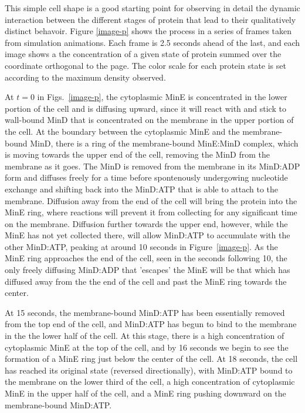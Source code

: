 \documentclass[letterpaper,twocolumn,amsmath,amssymb,pre]{revtex4-1}
\begin{document}
This simple cell shape is a good starting point for observing in
detail the dynamic interaction between the different stages of protein
that lead to their qualitatively distinct behavoir. Figure
\ref{image-p} shows the process in a series of frames taken from
simulation animations.  Each frame is 2.5 seconds ahead of the last,
and each image shows a the concentration of a given state of protein
summed over the coordinate orthogonal to the page.  The color scale
for each protein state is set according to the maximum density
observed.

At $t=0$ in Figs.~\ref{image-p}, the cytoplasmic MinE is concentrated
in the lower portion of the cell and is diffusing upward, since it
will react with and stick to wall-bound MinD that is concentrated on
the membrane in the upper portion of the cell.  At the boundary
between the cytoplasmic MinE and the membrane-bound MinD, there is a
ring of the membrane-bound MinE:MinD complex, which is moving towards
the upper end of the cell, removing the MinD from the membrane as it
goes.  The MinD is removed from the membrane in its MinD:ADP form and
diffuses freely for a time before spontenously undergowing nucleotide
exchange and shifting back into the MinD:ATP that is able to attach to
the membrane.  Diffusion away from the end of the cell will bring the
protein into the MinE ring, where reactions will prevent it from
collecting for any significant time on the membrane.  Diffusion
further towards the upper end, however, while the MinE has not yet
collected there, will allow MinD:ATP to accumulate with the other
MinD:ATP, peaking at around 10 seconds in Figure~\ref{image-p}.  As
the MinE ring approaches the end of the cell, seen in the seconds
following 10, the only freely diffusing MinD:ADP that 'escapes' the
MinE will be that which has diffused away from the the end of the cell
and past the MinE ring towards the center.

At 15 seconds, the membrane-bound MinD:ATP has been essentially
removed from the top end of the cell, and MinD:ATP has begun to bind
to the membrane in the the lower half of the cell.  At this stage,
there is a high concentration of cytoplasmic MinE at the top of the
cell, and by 16 seconds we begin to see the formation of a MinE ring
just below the center of the cell.  At 18 seconds, the cell has
reached its original state (reversed directionally), with MinD:ATP
bound to the membrane on the lower third of the cell, a high
concentration of cytoplasmic MinE in the upper half of the cell, and a
MinE ring pushing downward on the membrane-bound MinD:ATP.
\end{document}
